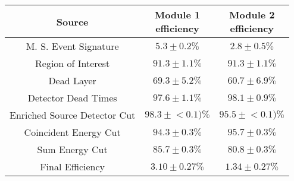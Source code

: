 \begin{tabular}{|c|c|c|}
\hline
  Source & \makecell{Module 1\\efficiency} & \makecell{Module 2\\efficiency} \\
\hline
  M. S. Event Signature & $5.3 \pm 0.2\%$ & $2.8 \pm 0.5\%$ \\
  Region of Interest & $91.3 \pm 1.1\%$ & $91.3 \pm 1.1\%$ \\
  Dead Layer & $69.3 \pm 5.2\%$ & $60.7 \pm 6.9\%$ \\
  Detector Dead Times & $97.6 \pm 1.1\%$ & $98.1 \pm 0.9\%$ \\
  Enriched Source Detector Cut & $98.3 \pm{}<\!0.1)\%$ & $95.5 \pm{}<\!0.1)\%$ \\
  Coincident Energy Cut & $94.3 \pm 0.3\%$ & $95.7 \pm 0.3\%$ \\
  Sum Energy Cut & $85.7 \pm 0.3\%$ & $80.8 \pm 0.3\%$ \\
  \hline Final Efficiency & $3.10 \pm 0.27\%$ & $1.34 \pm 0.27\%$ \\
\hline
\end{tabular}
